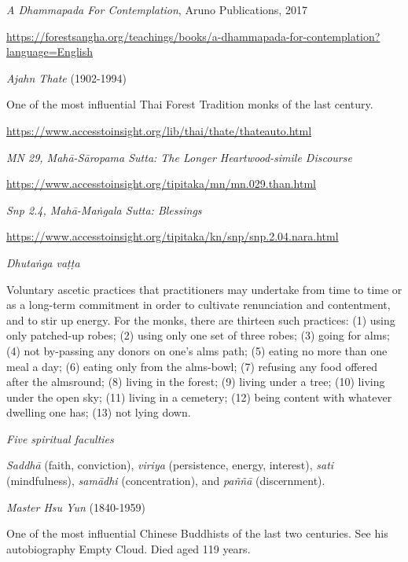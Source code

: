 \begin{thebibliography}{9}

 \emph{A Dhammapada For Contemplation}, Aruno Publications, 2017

  {\urlsize \url{https://forestsangha.org/teachings/books/a-dhammapada-for-contemplation?language=English}}

 \emph{Ajahn Thate} (1902-1994)

  One of the most influential Thai Forest Tradition monks of the last century.

  {\urlsize \url{https://www.accesstoinsight.org/lib/thai/thate/thateauto.html}}

 \emph{MN 29, Mahā-Sāropama Sutta: The Longer Heartwood-simile Discourse}

  {\urlsize \url{https://www.accesstoinsight.org/tipitaka/mn/mn.029.than.html}}

 \emph{Snp 2.4, Mahā-Maṅgala Sutta: Blessings}

  {\urlsize \url{https://www.accesstoinsight.org/tipitaka/kn/snp/snp.2.04.nara.html}}

 \emph{Dhutaṅga vaṭṭa}

  Voluntary ascetic practices that practitioners may undertake from time to time
  or as a long-term commitment in order to cultivate renunciation and
  contentment, and to stir up energy. For the monks, there are thirteen such
  practices: (1) using only patched-up robes; (2) using only one set of three
  robes; (3) going for alms; (4) not by-passing any donors on one’s alms path;
  (5) eating no more than one meal a day; (6) eating only from the alms-bowl;
  (7) refusing any food offered after the almsround; (8) living in the forest;
  (9) living under a tree; (10) living under the open sky; (11) living in a
  cemetery; (12) being content with whatever dwelling one has; (13) not lying
  down.

 \emph{Five spiritual faculties}

  \emph{Saddhā} (faith, conviction), \emph{viriya} (persistence, energy,
  interest), \emph{sati} (mindfulness), \emph{samādhi} (concentration), and
  \emph{paññā} (discernment).

 \emph{Master Hsu Yun} (1840-1959)

  One of the most influential Chinese Buddhists of the last two centuries. See
  his autobiography Empty Cloud. Died aged 119 years.


\end{thebibliography}
